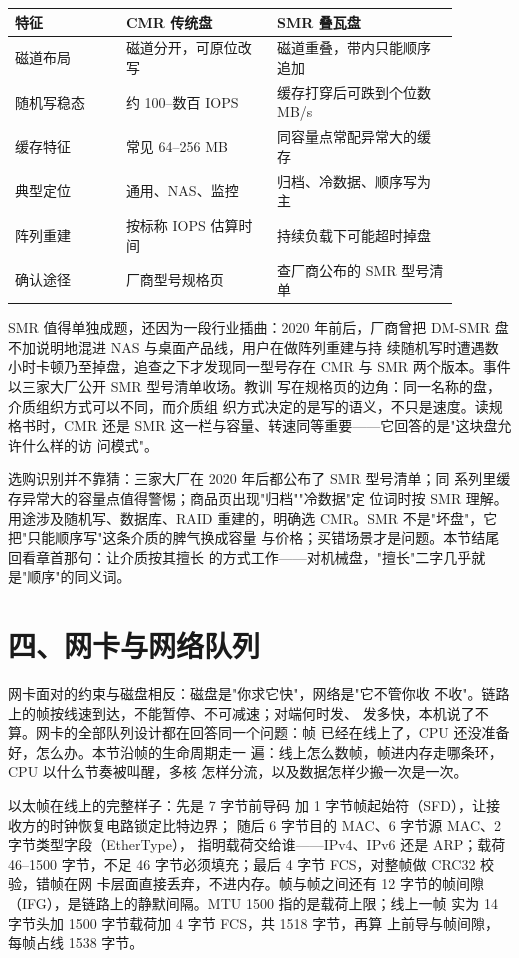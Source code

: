 \begin{longtable}{L{0.22\linewidth}L{0.30\linewidth}L{0.36\linewidth}}
\toprule
特征 & CMR 传统盘 & SMR 叠瓦盘 \\
\midrule
磁道布局 & 磁道分开，可原位改写 & 磁道重叠，带内只能顺序追加 \\
随机写稳态 & 约 100--数百 IOPS & 缓存打穿后可跌到个位数 MB/s \\
缓存特征 & 常见 64--256 MB & 同容量点常配异常大的缓存 \\
典型定位 & 通用、NAS、监控 & 归档、冷数据、顺序写为主 \\
阵列重建 & 按标称 IOPS 估算时间 & 持续负载下可能超时掉盘 \\
确认途径 & 厂商型号规格页 & 查厂商公布的 SMR 型号清单 \\
\bottomrule
\end{longtable}

SMR 值得单独成题，还因为一段行业插曲：2020 年前后，厂商曾把
DM-SMR 盘不加说明地混进 NAS 与桌面产品线，用户在做阵列重建与持
续随机写时遭遇数小时卡顿乃至掉盘，追查之下才发现同一型号存在
CMR 与 SMR 两个版本。事件以三家大厂公开 SMR 型号清单收场。教训
写在规格页的边角：同一名称的盘，介质组织方式可以不同，而介质组
织方式决定的是写的语义，不只是速度。读规格书时，CMR 还是 SMR
这一栏与容量、转速同等重要——它回答的是"这块盘允许什么样的访
问模式"。

选购识别并不靠猜：三家大厂在 2020 年后都公布了 SMR 型号清单；同
系列里缓存异常大的容量点值得警惕；商品页出现"归档""冷数据"定
位词时按 SMR 理解。用途涉及随机写、数据库、RAID 重建的，明确选
CMR。SMR 不是"坏盘"，它把"只能顺序写"这条介质的脾气换成容量
与价格；买错场景才是问题。本节结尾回看章首那句：让介质按其擅长
的方式工作——对机械盘，"擅长"二字几乎就是"顺序"的同义词。

\section{四、网卡与网络队列}

网卡面对的约束与磁盘相反：磁盘是"你求它快"，网络是"它不管你收
不收"。链路上的帧按线速到达，不能暂停、不可减速；对端何时发、
发多快，本机说了不算。网卡的全部队列设计都在回答同一个问题：帧
已经在线上了，CPU 还没准备好，怎么办。本节沿帧的生命周期走一
遍：线上怎么数帧，帧进内存走哪条环，CPU 以什么节奏被叫醒，多核
怎样分流，以及数据怎样少搬一次是一次。

以太帧在线上的完整样子：先是 7 字节前导码
加 1 字节帧起始符（SFD），让接收方的时钟恢复电路锁定比特边界；
随后 6 字节目的 MAC、6 字节源 MAC、2 字节类型字段（EtherType），
指明载荷交给谁——IPv4、IPv6 还是 ARP；载荷 46--1500 字节，不足
46 字节必须填充；最后 4 字节 FCS，对整帧做 CRC32 校验，错帧在网
卡层面直接丢弃，不进内存。帧与帧之间还有 12 字节的帧间隙
（IFG），是链路上的静默间隔。MTU 1500 指的是载荷上限；线上一帧
实为 14 字节头加 1500 字节载荷加 4 字节 FCS，共 1518 字节，再算
上前导与帧间隙，每帧占线 1538 字节。

